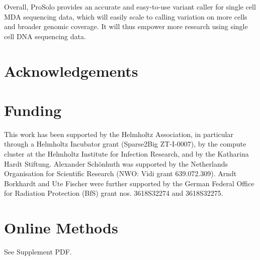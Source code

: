 \documentclass[12pt,inline]{wlscirep}
\begin{document}
Overall, ProSolo provides an accurate and easy-to-use variant caller for single cell MDA sequencing data, which will easily scale to calling variation on more cells and broader genomic coverage.
It will thus empower more research using single cell DNA sequencing data.



\section*{Acknowledgements}

\section*{Funding}
This work has been supported by the Helmholtz Association, in particular through a Helmholtz Incubator grant (Sparse2Big ZT-I-0007), by the compute cluster at the Helmholtz Institute for Infection Research, and by the Katharina Hardt Stiftung. Alexander Schönhuth was supported by the Netherlands Organisation for Scientific Research (NWO: Vidi grant 639.072.309). Arndt Borkhardt and Ute Fischer were further supported by the German Federal Office for Radiation Protection (BfS) grant nos. 3618S32274 and 3618S32275.

\section{Online Methods}
See Supplement PDF.
\end{document}
